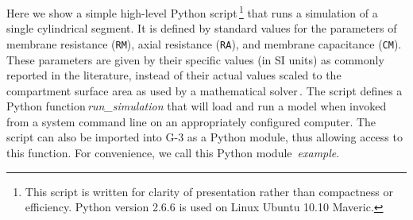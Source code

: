 \documentclass[10pt]{article}
\begin{document}
Here we show a simple high-level Python script\,\footnote{This script
  is written for clarity of presentation rather than compactness or
  efficiency.  Python version 2.6.6 is used on Linux Ubuntu 10.10
  Maveric.} that runs a simulation of a single cylindrical segment. It
is defined by standard values for the parameters of membrane
resistance ({\tt RM}), axial resistance ({\tt RA}), and membrane
capacitance ({\tt CM}).
These parameters are given by their specific values (in SI units) as
commonly reported in the literature, instead of their actual values
scaled to the compartment surface area as used by a mathematical
solver\,\cite{cornelis04:_neuros_param_handl}. The script defines a
Python function\,{\it run\_simulation} that will load and run a model when invoked from
a system command line on an appropriately configured computer.  The script
can also be imported into G-3 as a Python module, thus allowing access
to this function.  For convenience, we call this Python module\,{\it
  example}.
\end{document}

